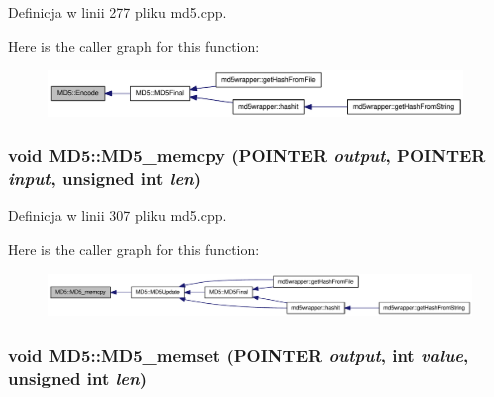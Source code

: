 Definicja w linii 277 pliku md5.cpp.

Here is the caller graph for this function:\nopagebreak
\begin{figure}[H]
\begin{center}
\leavevmode
\includegraphics[width=311pt]{d7/d46/a00002_c3c05716498203127920ba78b3ae8115_icgraph}
\end{center}
\end{figure}
\hypertarget{a00002_76c181f092e81df65dadf8861272ac80}{
\subsubsection[{MD5\_\-memcpy}]{\setlength{\rightskip}{0pt plus 5cm}void MD5::MD5\_\-memcpy ({\bf POINTER} {\em output}, \/  {\bf POINTER} {\em input}, \/  unsigned int {\em len})}}
\label{d7/d46/a00002_76c181f092e81df65dadf8861272ac80}




Definicja w linii 307 pliku md5.cpp.

Here is the caller graph for this function:\nopagebreak
\begin{figure}[H]
\begin{center}
\leavevmode
\includegraphics[width=391pt]{d7/d46/a00002_76c181f092e81df65dadf8861272ac80_icgraph}
\end{center}
\end{figure}
\hypertarget{a00002_e1a522aab83da49d1bd3f0a6f3edcd11}{
\subsubsection[{MD5\_\-memset}]{\setlength{\rightskip}{0pt plus 5cm}void MD5::MD5\_\-memset ({\bf POINTER} {\em output}, \/  int {\em value}, \/  unsigned int {\em len})}}
\label{d7/d46/a00002_e1a522aab83da49d1bd3f0a6f3edcd11}




